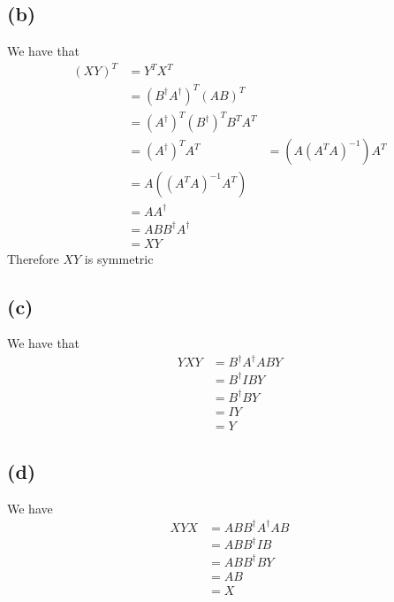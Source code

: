 \subsection*{(b)}
We have that
\begin{align*}
    (XY)^T&=Y^TX^T\\
    &=\left(B^{\dagger}A^{\dagger}\right)^T\left(AB\right)^T\\
    &= \left(A^{\dagger}\right)^T\left(B^{\dagger}\right)^T B^TA^T\\
    &=\left(A^{\dagger}\right)^TA^T
    &=\left(A(A^TA)^{-1}\right)A^T\\
    &=A\left((A^TA)^{-1}A^T\right)\\
    &=AA^{\dagger}\\
    &=ABB^{\dagger}A^{\dagger}\\
    &=XY
\end{align*}
Therefore $XY$ is symmetric
\subsection*{(c)}
We have that
\begin{align*}
    YXY&=B^{\dagger}A^{\dagger}ABY\\
    &=B^{\dagger}IBY\\
    &=B^{\dagger}BY\\
    &=IY\\
    &=Y
\end{align*}
\subsection*{(d)}
We have
\begin{align*}
    XYX&=ABB^{\dagger}A^{\dagger}AB\\
    &=ABB^{\dagger}IB\\
    &=ABB^{\dagger}BY\\
    &=AB\\
    &=X
\end{align*}

